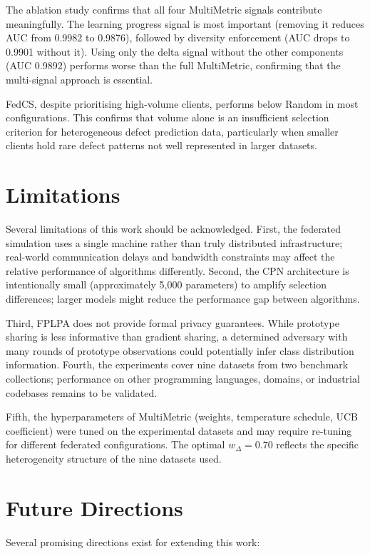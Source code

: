 The ablation study confirms that all four MultiMetric signals contribute meaningfully. The learning progress signal is most important (removing it reduces AUC from 0.9982 to 0.9876), followed by diversity enforcement (AUC drops to 0.9901 without it). Using only the delta signal without the other components (AUC 0.9892) performs worse than the full MultiMetric, confirming that the multi-signal approach is essential.

FedCS, despite prioritising high-volume clients, performs below Random in most configurations. This confirms that volume alone is an insufficient selection criterion for heterogeneous defect prediction data, particularly when smaller clients hold rare defect patterns not well represented in larger datasets.

\section{Limitations}

Several limitations of this work should be acknowledged. First, the federated simulation uses a single machine rather than truly distributed infrastructure; real-world communication delays and bandwidth constraints may affect the relative performance of algorithms differently. Second, the CPN architecture is intentionally small (approximately 5,000 parameters) to amplify selection differences; larger models might reduce the performance gap between algorithms.

Third, FPLPA does not provide formal privacy guarantees. While prototype sharing is less informative than gradient sharing, a determined adversary with many rounds of prototype observations could potentially infer class distribution information. Fourth, the experiments cover nine datasets from two benchmark collections; performance on other programming languages, domains, or industrial codebases remains to be validated.

Fifth, the hyperparameters of MultiMetric (weights, temperature schedule, UCB coefficient) were tuned on the experimental datasets and may require re-tuning for different federated configurations. The optimal $w_\Delta=0.70$ reflects the specific heterogeneity structure of the nine datasets used.

\section{Future Directions}

Several promising directions exist for extending this work:

